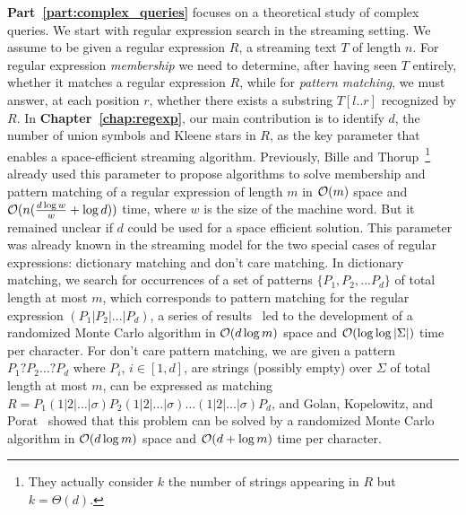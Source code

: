 \textbf{Part~\ref{part:complex_queries}} focuses on a theoretical study of complex queries. 
%
We start with regular expression search in the streaming setting.
%
We assume to be given a regular expression $R$, a streaming text $T$ of length $n$. For regular expression \emph{membership} we need to determine, after having seen $T$ entirely, whether it matches a regular expression $R$, while for \emph{pattern matching}, we must answer, at each position $r$, whether there exists a substring $T[l..r]$ recognized by $R$.
In \textbf{Chapter~\ref{chap:regexp}}, our main contribution is to identify $d$, the number of union symbols and Kleene stars in $R$, as the key parameter that enables a space-efficient streaming algorithm. 
Previously, Bille and Thorup~\cite{doi:10.1137/1.9781611973075.104}\footnote{They actually consider $k$ the number of strings appearing in $R$ but $k=\Theta(d)$.} already used this parameter to propose algorithms to solve membership and pattern matching of a regular expression of length $m$ in $\mathcal{O}(m)$ space and $\mathcal{O}(n(\frac{d\log w}{w} + \log d))$ time, where $w$ is the size of the machine word. But it remained unclear if $d$ could be used for a space efficient solution.
This parameter was already known in the streaming model for the two special cases of regular expressions: dictionary matching and don't care matching. In dictionary matching, we search for occurrences of a set of patterns $\{P_1, P_2, ... P_d \}$ of total length at most $m$, which corresponds to pattern matching for the regular expression $(P_1| P_2| ... | P_d)$, a series of results~\cite{Porat:09,pattern_match_BG14,DBLP:conf/esa/CliffordFPSS15,DBLP:conf/esa/GolanP17,DBLP:conf/icalp/GolanKP18} led to the development of a randomized Monte Carlo algorithm in $\mathcal{O}(d\log m)$ space and $\mathcal{O}(\log \log |\Sigma|)$ time per character.
For don't care pattern matching, we are given a pattern $P_1 ? P_2 ... ? P_d$ where $P_i$, $i \in [1,d]$, are strings (possibly empty) over $\Sigma$ of total length at most $m$, can be expressed as matching $R = P_1 (1|2|\ldots|\sigma) P_2 (1|2|\ldots|\sigma) \ldots (1|2|\ldots|\sigma) P_{d}$, and Golan, Kopelowitz, and Porat~\cite{DBLP:journals/algorithmica/GolanKP19} showed that this problem can be solved by a randomized Monte Carlo algorithm in $\mathcal{O}(d \log m)$ space and $\mathcal{O}(d+\log m)$ time per character.

